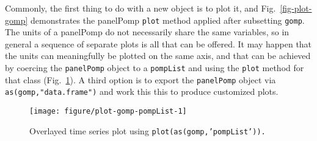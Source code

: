 \documentclass[12pt]{article}\usepackage[]{graphicx}\usepackage[table]{xcolor}
\makeatletter
\def\maxwidth{ %
  \ifdim\Gin@nat@width>\linewidth
    \linewidth
  \else
    \Gin@nat@width
  \fi
}
\newenvironment{knitrout}{}{} %
\newcommand\code{\texttt}
\makeatother
\begin{document}
Commonly, the first thing to do with a new object is to plot it, and Fig.~\ref{fig-plot-gomp} demonstrates the panelPomp \code{plot} method applied after subsetting \code{gomp}.
The units of a panelPomp do not necessarily share the same variables, so in general a sequence of separate plots is all that can be offered.
It may happen that the units can meaningfully be plotted on the same axis, and that can be achieved by coercing the \code{panelPomp} object to a \code{pompList} and using the \code{plot} method for that class (Fig.~\ref{fig:plot-gomp-pompList}).
A third option is to export the \code{panelPomp} object via \code{as(gomp,"data.frame")} and work this this to produce customized plots.

\begin{knitrout}
\color{fgcolor}\begin{figure}

{\centering \texttt{[image: figure/plot-gomp-pompList-1]} 

}

\caption{Overlayed time series plot using \code{plot(as(gomp,'pompList')).}}\label{fig:plot-gomp-pompList}
\end{figure}

\end{knitrout}
\end{document}
